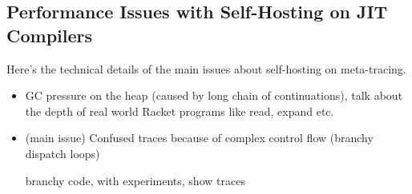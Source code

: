 \subsection{Performance Issues with Self-Hosting on JIT Compilers}
\label{subsec:performance}


Here's the technical details of the main issues about self-hosting on
meta-tracing.

\begin{itemize}
\item GC pressure on the heap (caused by long chain of continuations),
  talk about the depth of real world Racket programs like read, expand
  etc.

\item (main issue) Confused traces because of complex control flow
  (branchy dispatch loops)

  branchy code, with experiments, show traces
  
\end{itemize}
